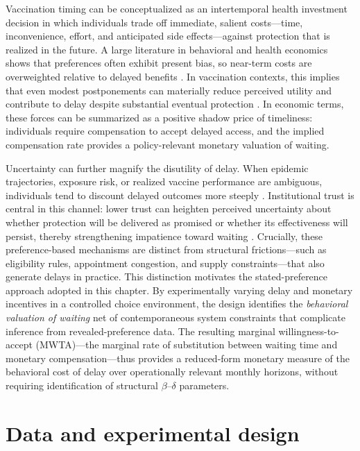 \documentclass[doublespacing]{utdthesis}
\let\cite=\citep
\begin{document}
Vaccination timing can be conceptualized as an intertemporal health investment decision in which individuals trade off immediate, salient costs—time, inconvenience, effort, and anticipated side effects—against protection that is realized in the future. A large literature in behavioral and health economics shows that preferences often exhibit present bias, so near-term costs are overweighted relative to delayed benefits \cite{Laibson1997,ODonoghueRabin2001}. In vaccination contexts, this implies that even modest postponements can materially reduce perceived utility and contribute to delay despite substantial eventual protection \cite{Guillon2024}. In economic terms, these forces can be summarized as a positive shadow price of timeliness: individuals require compensation to accept delayed access, and the implied compensation rate provides a policy-relevant monetary valuation of waiting.

Uncertainty can further magnify the disutility of delay. When epidemic trajectories, exposure risk, or realized vaccine performance are ambiguous, individuals tend to discount delayed outcomes more steeply \cite{AttemaBleichrodt2013,Andersen2018}. Institutional trust is central in this channel: lower trust can heighten perceived uncertainty about whether protection will be delivered as promised or whether its effectiveness will persist, thereby strengthening impatience toward waiting \cite{Liu2021}. Crucially, these preference-based mechanisms are distinct from structural frictions—such as eligibility rules, appointment congestion, and supply constraints—that also generate delays in practice. This distinction motivates the stated-preference approach adopted in this chapter. By experimentally varying delay and monetary incentives in a controlled choice environment, the design identifies the \emph{behavioral valuation of waiting} net of contemporaneous system constraints that complicate inference from revealed-preference data. The resulting marginal willingness-to-accept (MWTA)—the marginal rate of substitution between waiting time and monetary compensation—thus provides a reduced-form monetary measure of the behavioral cost of delay over operationally relevant monthly horizons, without requiring identification of structural $\beta$--$\delta$ parameters.


\section{Data and experimental design}
\label{subsec:essay2_data}
\end{document}
